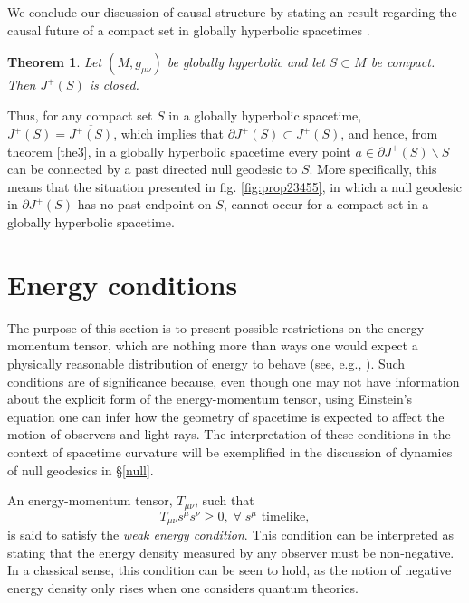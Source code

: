 \documentclass[
12pt,		%
openright,	%
twoside,  %
a4paper,			%
chapter=TITLE,		%
english,			%
french,				%
spanish,			%
brazil				%
]{USPSC-classe/USPSC}
\newtheorem{theorem}{Theorem}[section]
\begin{document}
We conclude our discussion of causal structure by stating an result regarding the causal future of a compact set in globally hyperbolic spacetimes \cite{Galloway2014}. 
\begin{theorem}\label{theorem7}
    Let $(M,g_{\mu\nu})$ be globally hyperbolic and let $S\subset M$ be compact. Then $J^+(S)$ is closed. 
\end{theorem}

Thus, for any compact set $S$ in a globally hyperbolic spacetime, $J^+(S)=\overline{J^+(S)}$, which implies that $\partial J^+(S)\subset J^+(S)$, and hence, from theorem \ref{the3}, in a globally hyperbolic spacetime every point $a\in\partial J^+(S)\backslash{S}$ can be connected by a past directed null geodesic to $S$. More specifically, this means that the situation presented in fig. \ref{fig:prop23455}, in which a null geodesic in $\partial J^+(S)$ has no past endpoint on $S$, cannot occur for a compact set in a globally hyperbolic spacetime. 

\section{Energy conditions}\label{energycon}

The purpose of this section is to present possible restrictions on the energy-momentum tensor, which are nothing more than ways one would expect a physically reasonable distribution of energy to behave (see, e.g., \cite{Hawking1973}). Such conditions are of significance because, even though one may not have information about the explicit form of the energy-momentum tensor, using Einstein's equation one can infer how the geometry of spacetime is expected to affect the motion of observers and light rays. The interpretation of these conditions in the context of spacetime curvature will be exemplified in the discussion of dynamics of null geodesics in \S\;\ref{null}.

An energy-momentum tensor, $T_{\mu\nu}$, such that
\begin{equation}
    T_{\mu\nu}s^{\mu}s^{\nu}\geq 0,\;\forall\;s^{\mu}\text{ timelike},
\end{equation}
is said to satisfy the \textit{weak energy condition}. This condition can be interpreted as stating that the energy density measured by any observer must be non-negative. In a classical sense, this condition can be seen to hold, as the notion of negative energy density only rises when one considers quantum theories. 
\end{document}
